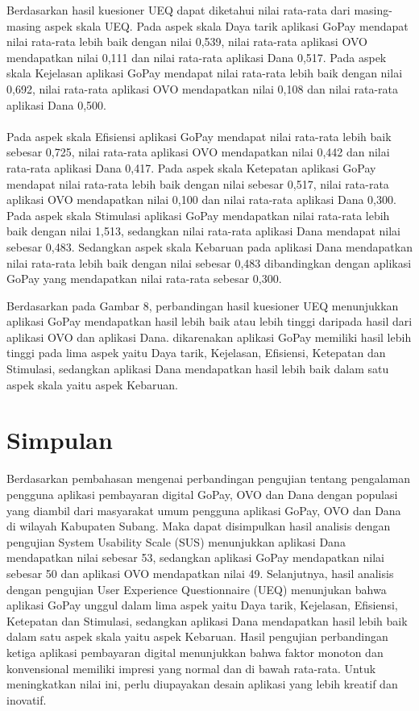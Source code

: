 \documentclass[
 manuscript=article,  %
  layout=publish, 
  year=2024, 
  month= Februari, %
  volume=8,
  number=1 
]{JIKO}
\begin{document}
Berdasarkan hasil kuesioner UEQ dapat diketahui nilai rata-rata dari masing-masing aspek skala UEQ. Pada aspek skala Daya tarik aplikasi GoPay mendapat nilai rata-rata lebih baik dengan nilai 0,539, nilai rata-rata aplikasi OVO mendapatkan nilai 0,111 dan nilai rata-rata aplikasi Dana 0,517. Pada aspek skala Kejelasan aplikasi GoPay mendapat nilai rata-rata lebih baik dengan nilai 0,692, nilai rata-rata aplikasi OVO mendapatkan nilai 0,108 dan nilai rata-rata aplikasi Dana 0,500. 
 \\ \\ 
Pada aspek skala Efisiensi aplikasi GoPay mendapat nilai rata-rata lebih baik sebesar 0,725, nilai rata-rata aplikasi OVO mendapatkan nilai 0,442 dan nilai rata-rata aplikasi Dana 0,417. Pada aspek skala Ketepatan aplikasi GoPay mendapat nilai rata-rata lebih baik dengan nilai sebesar 0,517, nilai rata-rata aplikasi OVO mendapatkan nilai 0,100 dan nilai rata-rata aplikasi Dana 0,300. Pada aspek skala Stimulasi aplikasi GoPay mendapatkan nilai rata-rata lebih baik dengan nilai 1,513, sedangkan nilai rata-rata aplikasi Dana mendapat nilai sebesar 0,483. Sedangkan aspek skala Kebaruan pada aplikasi Dana mendapatkan nilai rata-rata lebih baik dengan nilai sebesar 0,483 dibandingkan dengan aplikasi GoPay yang mendapatkan nilai rata-rata sebesar 0,300. 

Berdasarkan pada Gambar 8, perbandingan hasil kuesioner UEQ menunjukkan aplikasi GoPay mendapatkan hasil lebih baik atau lebih tinggi daripada hasil dari aplikasi OVO dan aplikasi Dana. dikarenakan aplikasi GoPay memiliki hasil lebih tinggi pada lima aspek yaitu Daya tarik, Kejelasan, Efisiensi, Ketepatan dan Stimulasi, sedangkan aplikasi Dana mendapatkan hasil lebih baik dalam satu aspek skala yaitu aspek Kebaruan.

\section{Simpulan}

Berdasarkan pembahasan mengenai perbandingan pengujian tentang pengalaman pengguna aplikasi pembayaran digital GoPay, OVO dan Dana dengan populasi yang diambil dari masyarakat umum pengguna aplikasi GoPay, OVO dan Dana di wilayah Kabupaten Subang. Maka dapat disimpulkan hasil analisis dengan pengujian System Usability Scale (SUS) menunjukkan aplikasi Dana mendapatkan nilai sebesar 53, sedangkan aplikasi GoPay mendapatkan nilai sebesar 50 dan aplikasi OVO mendapatkan nilai 49. Selanjutnya, hasil analisis dengan pengujian User Experience Questionnaire (UEQ) menunjukan bahwa aplikasi GoPay unggul dalam lima aspek yaitu Daya tarik, Kejelasan, Efisiensi, Ketepatan dan Stimulasi, sedangkan aplikasi Dana mendapatkan hasil lebih baik dalam satu aspek skala yaitu aspek Kebaruan. Hasil pengujian perbandingan ketiga aplikasi pembayaran digital menunjukkan bahwa faktor monoton dan konvensional memiliki impresi yang normal dan di bawah rata-rata. Untuk meningkatkan nilai ini, perlu diupayakan desain aplikasi yang lebih kreatif dan inovatif.
\end{document}
